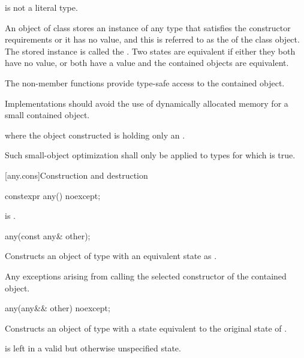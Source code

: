 \pnum
\begin{note}  is not a literal type. \end{note}

\pnum
An object of class  stores an instance of any type that satisfies the constructor requirements or it has no value,
and this is referred to as the  of the class  object.
The stored instance is called the .
Two states are equivalent if either they both have no value, or both have a value and the contained objects are equivalent.

\pnum
The non-member  functions provide type-safe access to the contained object.

\pnum
Implementations should avoid the use of dynamically allocated memory for a small contained object.
\begin{example}
where the object constructed is holding only an .
\end{example}
Such small-object optimization shall only be applied to types  for which
 is true.

[any.cons]{Construction and destruction}

%
\begin{itemdecl}
constexpr any() noexcept;
\end{itemdecl}

\begin{itemdescr}
\pnum
\postcondition
{} is .
\end{itemdescr}

%
\begin{itemdecl}
any(const any& other);
\end{itemdecl}

\begin{itemdescr}
\pnum
\effects
Constructs an object of type  with an equivalent state as .

\pnum
\throws
Any exceptions arising from calling the selected constructor of the contained object.
\end{itemdescr}

%
\begin{itemdecl}
any(any&& other) noexcept;
\end{itemdecl}

\begin{itemdescr}
\pnum
\effects
Constructs an object of type  with a state equivalent to the original state of .

\pnum
\postcondition
{} is left in a valid but otherwise unspecified state.
\end{itemdescr}

